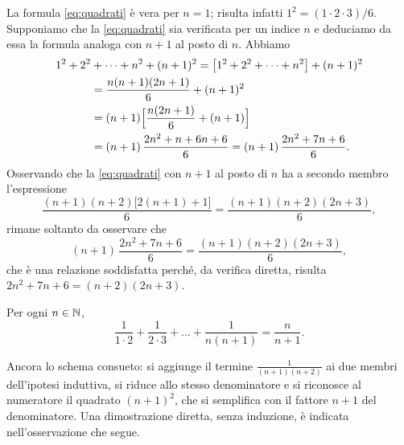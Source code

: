 \begin{dimostrazione}
La formula \eqref{eq:quadrati} è vera per $n=1$; risulta infatti $1^{2}=(1\cdot2\cdot3)/6$.
Supponiamo che la \eqref{eq:quadrati} sia verificata per un indice $n$ e deduciamo da
essa la formula analoga con $n+1$ al posto di $n$. Abbiamo
\begin{equation}\label{eq:quadrati-passo}
\begin{split}
  1^{2}+2^{2}&+\dots+n^{2}+(n+1)^{2}
  =\bigl[1^{2}+2^{2}+\dots+n^{2}\bigr]+(n+1)^{2}\\
  &=\frac{n(n+1)(2n+1)}{6}+(n+1)^{2}\\
  &=(n+1)\Bigl[\frac{n(2n+1)}{6}+(n+1)\Bigr]\\
  &=(n+1)\,\frac{2n^{2}+n+6n+6}{6}
   =(n+1)\,\frac{2n^{2}+7n+6}{6}.
\end{split}
\end{equation}
Osservando che la \eqref{eq:quadrati} con $n+1$ al posto di $n$ ha a secondo membro
l'espressione
\begin{equation}\label{eq:quadrati-target}
  \frac{(n+1)(n+2)\bigl[2(n+1)+1\bigr]}{6}=\frac{(n+1)(n+2)(2n+3)}{6},
\end{equation}
rimane soltanto da osservare che
\[
  (n+1)\,\frac{2n^{2}+7n+6}{6}=\frac{(n+1)(n+2)(2n+3)}{6},
\]
che è una relazione soddisfatta perché, da verifica diretta, risulta
$2n^{2}+7n+6=(n+2)(2n+3)$.
\end{dimostrazione}

\begin{proposizione}\label{prop:telescopica}
Per ogni $n\in\mathbb{N}$,
\begin{equation}\label{eq:telescopica}
  \frac{1}{1\cdot2}+\frac{1}{2\cdot3}+\dots+\frac{1}{n(n+1)}=\frac{n}{n+1}.
\end{equation}
\end{proposizione}

\begin{schema}
\end{schema}

\begin{strategia}
Ancora lo schema consueto: si aggiunge il termine $\frac{1}{(n+1)(n+2)}$ ai due membri
dell'ipotesi induttiva, si riduce allo stesso denominatore e si riconosce al numeratore
il quadrato $(n+1)^{2}$, che si semplifica con il fattore $n+1$ del denominatore. Una
dimostrazione diretta, senza induzione, è indicata nell'osservazione che segue.
\end{strategia}

